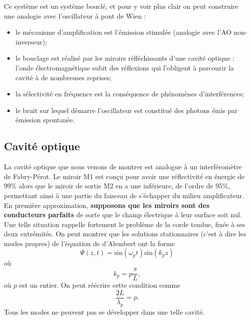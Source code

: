 \documentclass[11pt,a4paper]{report}
\begin{document}
Ce système est un système bouclé, et pour y voir plus clair on peut construire une analogie avec l'oscillateur à pont de Wien :
\begin{itemize}
	\item le mécanisme d'amplification est l'émission stimulée (analogie avec l'AO non-inverseur);
	\item le bouclage est réalisé par les miroirs réfléchissants d'une cavité optique : l'onde 					électromagnétique subit des réflexions qui l'obligent à parcourir la cavité à de nombreuses 			reprises;
	\item la sélectivité en fréquence est la conséquence de phénomènes d'interférences;
	\item le bruit sur lequel démarre l'oscillateur est constitué des photons émis par émission 				spontanée.
\end{itemize}

\subsection{Cavité optique}

La cavité optique que nous venons de montrer est analogue à un interféromètre de Fabry-Pérot. Le miroir M1 est conçu pour avoir une réflectivité en énergie de 99\% alors que le miroir de sortie M2 en a une inférieure, de l'ordre de 95\%, permettant ainsi à une partie du faisceau de s'échapper du milieu amplificateur.\\

En première approximation, \textbf{supposons que les miroirs sont des conducteurs parfaits} de sorte que le champ électrique à leur surface soit nul. Une telle situation rappelle fortement le problème de la corde tendue, fixée à ses deux extrémités. On peut montrer que les solutions stationnaires (c'est à dire les modes propres) de l'équation de d'Alembert ont la forme
\begin{equation}
	\Psi(z,t) = \text{sin}(\omega_p t)\text{sin}(k_p z)
\end{equation}
où
\begin{equation}
	k_p = p\frac{\pi}{L}, 
\end{equation}
où $p$ est un entier. On peut réécrire cette condition comme
\begin{equation}
	\frac{2L}{\lambda_p} = p.
\end{equation}
Tous les modes ne peuvent pas se développer dans une telle cavité.\\
\end{document}
